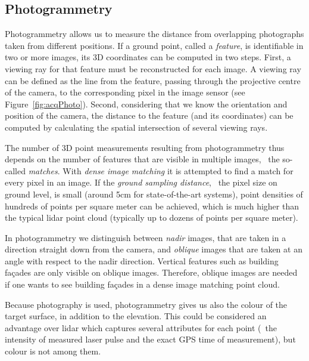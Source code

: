 \subsection{Photogrammetry}
Photogrammetry allows us to measure the distance from overlapping photographs taken from different positions. 
If a ground point, called a \emph{feature}, is identifiable in two or more images, its 3D coordinates can be computed in two steps. 
First, a viewing ray for that feature must be reconstructed for each image. 
A viewing ray can be defined as the line from the feature, passing through the projective centre of the camera, to the corresponding pixel in the image sensor (see Figure~\ref{fig:acqPhoto}). 
Second, considering that we know the orientation and position of the camera, the distance to the feature (and its coordinates) can be computed by calculating the spatial intersection of several viewing rays.


The number of 3D point measurements resulting from photogrammetry thus depends on the number of features that are visible in multiple images, \ie\ the so-called \emph{matches}.
With \emph{dense image matching} 
it is attempted to find a match for every pixel in an image. 
If the \emph{ground sampling distance}, \ie\ the pixel size on ground level, is small (around 5cm for state-of-the-art systems), point densities of hundreds of points per square meter can be achieved, which is much higher than the typical lidar point cloud (typically up to dozens of points per square meter). 

In photogrammetry we distinguish between \emph{nadir} images, 
that are taken in a direction straight down from the camera, and \emph{oblique}
images that are taken at an angle with respect to the nadir direction.
Vertical features such as building façades are only visible on oblique images.
Therefore, oblique images are needed if one wants to see building façades in a dense image matching point cloud.

Because photography is used, photogrammetry gives us also the colour of the target surface, in addition to the elevation.
This could be considered an advantage over lidar which captures several attributes for each point (\eg\ the intensity of measured laser pulse and the exact GPS time of measurement), but colour is not among them.

